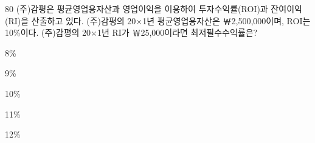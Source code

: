 \begin{question}{80}
(주)감평은 평균영업용자산과 영업이익을 이용하여 투자수익률(ROI)과 잔여이익(RI)을 산출하고 있다. (주)감평의 20×1년 평균영업용자산은 ￦2,500,000이며, ROI는 10\%이다. (주)감평의 20×1년 RI가 ￦25,000이라면 최저필수수익률은?
\begin{choices}
  \item 8\%
  \item 9\%
  \item 10\%
  \item 11\%
  \item 12\%
\end{choices}
\end{question}
